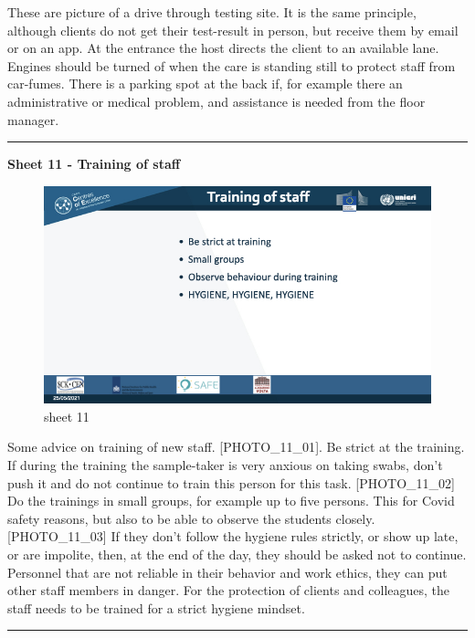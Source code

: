 \documentclass[
]{book}
\begin{document}
These are picture of a drive through testing site. It is the same
principle, although clients do not get their test-result in person, but
receive them by email or on an app. At the entrance the host directs the
client to an available lane. Engines should be turned of when the care
is standing still to protect staff from car-fumes. There is a parking
spot at the back if, for example there an administrative or medical
problem, and assistance is needed from the floor manager.

\begin{center}\rule{0.5\linewidth}{0.5pt}\end{center}

\textbf{Sheet 11 - Training of staff}

\begin{figure}
\centering
\includegraphics{images/m05/m05_Workflow_final.011.jpeg}
\caption{sheet 11}
\end{figure}

Some advice on training of new staff. {[}PHOTO\_11\_01{]}. Be strict at the
training. If during the training the sample-taker is very anxious on
taking swabs, don't push it and do not continue to train this person
for this task. {[}PHOTO\_11\_02{]} Do the trainings in small groups, for
example up to five persons. This for Covid safety reasons, but also to
be able to observe the students closely. {[}PHOTO\_11\_03{]} If they don't
follow the hygiene rules strictly, or show up late, or are impolite,
then, at the end of the day, they should be asked not to continue.
Personnel that are not reliable in their behavior and work ethics, they
can put other staff members in danger. For the protection of clients and
colleagues, the staff needs to be trained for a strict hygiene mindset.

\begin{center}\rule{0.5\linewidth}{0.5pt}\end{center}
\end{document}
